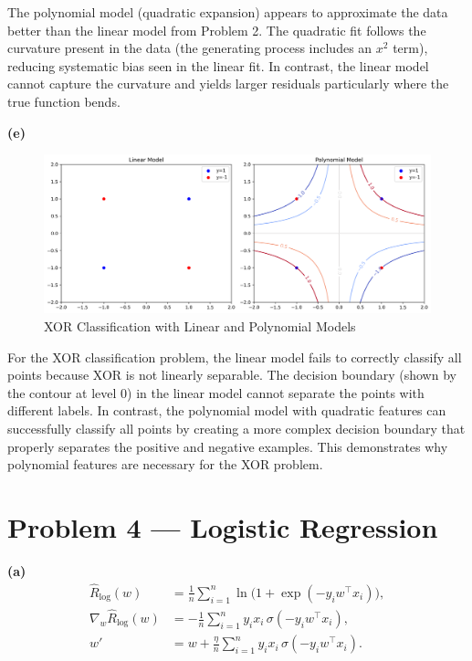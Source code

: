 \documentclass[11pt]{article}
\begin{document}
The polynomial model (quadratic expansion) appears to approximate the data better than the linear model from Problem 2. The quadratic fit follows the curvature present in the data (the generating process includes an $x^2$ term), reducing systematic bias seen in the linear fit. In contrast, the linear model cannot capture the curvature and yields larger residuals particularly where the true function bends.

\noindent\textbf{(e)} 

\begin{figure}[H]
  \centering
  \includegraphics[width=0.9\linewidth]{3-e-output.png}
  \caption{XOR Classification with Linear and Polynomial Models}
  \label{fig:xor-classification}
\end{figure}

For the XOR classification problem, the linear model fails to correctly classify all points because XOR is not linearly separable. The decision boundary (shown by the contour at level 0) in the linear model cannot separate the points with different labels. In contrast, the polynomial model with quadratic features can successfully classify all points by creating a more complex decision boundary that properly separates the positive and negative examples. This demonstrates why polynomial features are necessary for the XOR problem.

\section*{Problem 4 --- Logistic Regression}

\noindent\textbf{(a)} 
\begin{align*}
\hat R_{\log}(w) &= \frac1n \sum_{i=1}^n \ln\!\big(1+\exp(-y_i w^\top x_i)\big), \\
\nabla_w \hat R_{\log}(w) &= -\frac1n\sum_{i=1}^n y_i x_i\,\sigma(-y_i w^\top x_i), \\
w' &= w + \frac{\eta}{n}\sum_{i=1}^n y_i x_i\,\sigma(-y_i w^\top x_i).
\end{align*}
\end{document}
